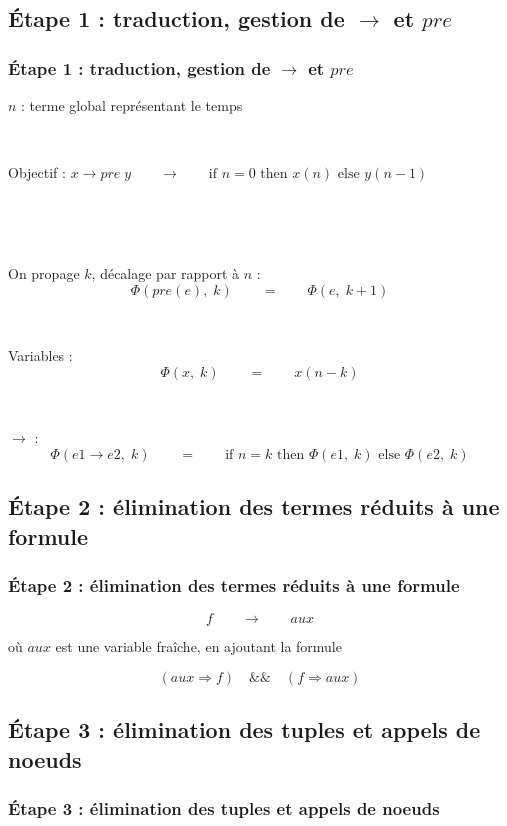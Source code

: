 \documentclass[18pt]{beamer}
\begin{document}
\subsection{Étape 1 : traduction, gestion de $\rightarrow$ et $pre$}
\begin{frame}
\frametitle{Étape 1 : traduction, gestion de $\rightarrow$ et $pre$}
	
	$n$ : terme global représentant le temps
	
	\
	
	Objectif : \qquad $x\rightarrow pre \; y \qquad\longrightarrow\qquad \text{if }n=0 \text{ then } x(n) \text{ else } y(n-1)$
	
	\
	
	\
	
	On propage $k$, décalage par rapport à $n$ :
	\vspace{-1em}
	$$\Phi(pre(e),\;k) \qquad=\qquad \Phi(e,\;k+1)$$
	
	\
	
	Variables :
	\vspace{-1em}
	$$\Phi(x,\;k) \qquad=\qquad x(n-k)$$
	
	\
	
	$\rightarrow$ :
	\vspace{-1em}
	$$\Phi(e1\rightarrow e2, \;k) \qquad=\qquad \text{if }n=k \text{ then } \Phi(e1,\;k) \text{ else } \Phi(e2,\;k)$$
	
\end{frame}


\subsection{Étape 2 :
élimination des termes réduits à une formule}
\begin{frame}
\frametitle{Étape 2 :
élimination des termes réduits à une formule}
	
	$$f \qquad\longrightarrow\qquad aux$$

	où $aux$ est une variable fraîche, en ajoutant la formule
	
	$$(aux \Rightarrow f) \quad \&\& \quad (f \Rightarrow aux)$$
	
	
\end{frame}


\subsection{Étape 3 :
élimination des tuples et appels de noeuds}
\begin{frame}
\frametitle{Étape 3 :
élimination des tuples et appels de noeuds}
	
\end{frame}
\end{document}
